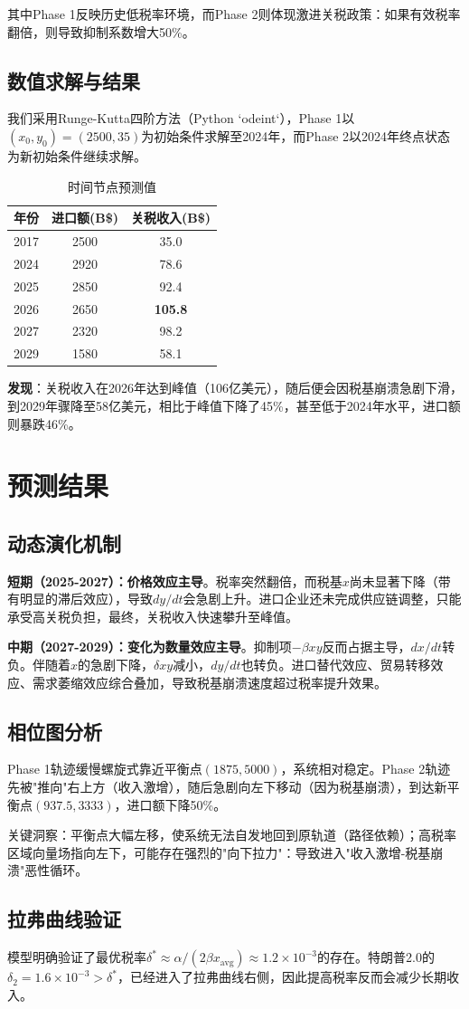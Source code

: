 \documentclass[11pt]{article}
\begin{document}
其中Phase 1反映历史低税率环境，而Phase 2则体现激进关税政策：如果有效税率翻倍，则导致抑制系数增大50\%。

\subsection{数值求解与结果}
我们采用Runge-Kutta四阶方法（Python `odeint`），Phase 1以$(x_0, y_0) = (2500, 35)$为初始条件求解至2024年，而Phase 2以2024年终点状态为新初始条件继续求解。

\begin{table}[H]
\centering
\caption{时间节点预测值}
\begin{tabular}{ccc}
\toprule
\textbf{年份} & \textbf{进口额(B\$)} & \textbf{关税收入(B\$)} \\
\midrule
2017 & 2500 & 35.0 \\
2024 & 2920 & 78.6 \\
2025 & 2850 & 92.4 \\
2026 & 2650 & \textbf{105.8} \\
2027 & 2320 & 98.2 \\
2029 & 1580 & 58.1 \\
\bottomrule
\end{tabular}
\end{table}

\textbf{发现}：关税收入在2026年达到峰值（106亿美元），随后便会因税基崩溃急剧下滑，到2029年骤降至58亿美元，相比于峰值下降了45\%，甚至低于2024年水平，进口额则暴跌46\%。

\section{预测结果}

\subsection{动态演化机制}
\textbf{短期（2025-2027）：价格效应主导}。税率突然翻倍，而税基$x$尚未显著下降（带有明显的滞后效应），导致$dy/dt$会急剧上升。进口企业还未完成供应链调整，只能承受高关税负担，最终，关税收入快速攀升至峰值。

\textbf{中期（2027-2029）：变化为数量效应主导}。抑制项$-\beta xy$反而占据主导，$dx/dt$转负。伴随着$x$的急剧下降，$\delta xy$减小，$dy/dt$也转负。进口替代效应、贸易转移效应、需求萎缩效应综合叠加，导致税基崩溃速度超过税率提升效果。

\subsection{相位图分析}
Phase 1轨迹缓慢螺旋式靠近平衡点$(1875, 5000)$，系统相对稳定。Phase 2轨迹先被"推向"右上方（收入激增），随后急剧向左下移动（因为税基崩溃），到达新平衡点$(937.5, 3333)$，进口额下降50\%。

关键洞察：平衡点大幅左移，使系统无法自发地回到原轨道（路径依赖）；高税率区域向量场指向左下，可能存在强烈的"向下拉力"：导致进入"收入激增-税基崩溃"恶性循环。

\subsection{拉弗曲线验证}
模型明确验证了最优税率$\delta^* \approx \alpha/(2\beta x_{\text{avg}}) \approx 1.2\times10^{-3}$的存在。特朗普2.0的$\delta_2 = 1.6\times10^{-3} > \delta^*$，已经进入了拉弗曲线右侧，因此提高税率反而会减少长期收入。
\end{document}
